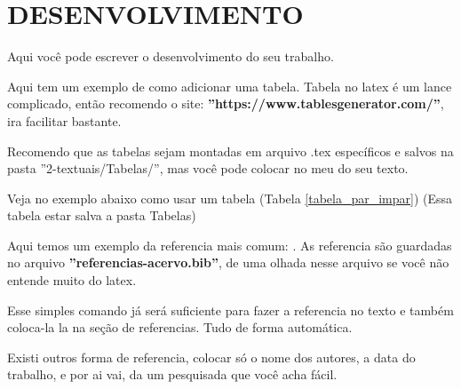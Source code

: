 \chapter{DESENVOLVIMENTO}
\label{Desenvolvimento}

Aqui você pode escrever o desenvolvimento do seu trabalho.

Aqui tem um exemplo de como adicionar uma tabela. Tabela no latex é um lance complicado, então recomendo o site: \textbf{''https://www.tablesgenerator.com/''}, ira facilitar bastante.

Recomendo que as tabelas sejam montadas em arquivo .tex específicos e salvos na pasta ''2-textuais/Tabelas/'', mas você pode colocar no meu do seu texto.

Veja no exemplo abaixo como usar um tabela (Tabela \ref{tabela_par_impar}) (Essa tabela estar salva a pasta Tabelas)




Aqui temos um exemplo da referencia mais comum: \cite{Paradeda2019you}. As referencia são guardadas no arquivo \textbf{''referencias-acervo.bib''}, de uma olhada nesse arquivo se você não entende muito do latex.

Esse simples comando já será suficiente para fazer a referencia no texto e também coloca-la la na seção de referencias. Tudo de forma automática.

Existi outros forma de referencia, colocar só o nome dos autores, a data do trabalho, e por ai vai, da um pesquisada que você acha fácil.